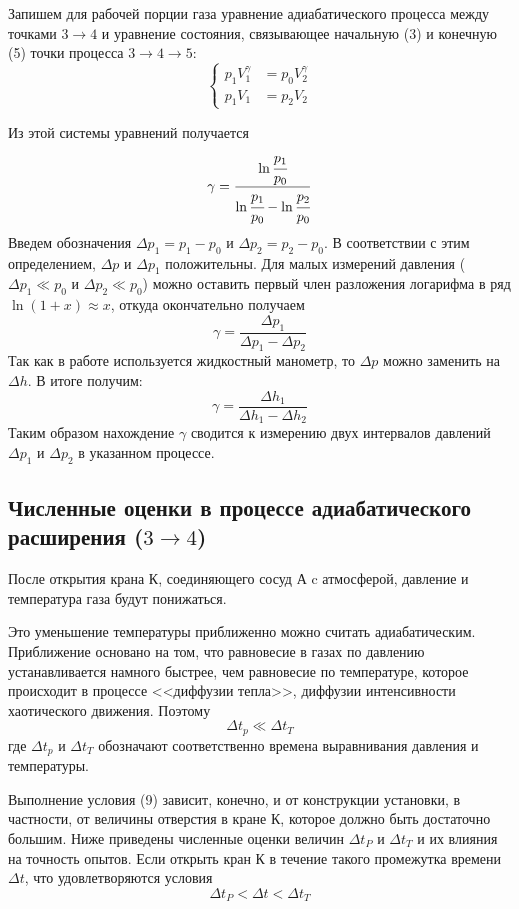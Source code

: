 \documentclass[a4paper,12pt]{article}
\theoremstyle{plain} %
\theoremstyle{definition} %
\theoremstyle{remark} %
\begin{document}
Запишем для рабочей порции газа уравнение адиабатического процесса между точками $3\rightarrow4$ и уравнение состояния, связывающее начальную (3) и конечную (5) точки процесса $3\rightarrow4\rightarrow5$:
\[
\left\{
\begin{aligned}
p_1V_1^\gamma &= p_0V_2^\gamma \\
p_1V_1 &= p_2V_2
\end{aligned}
\right.
\]

Из этой системы уравнений получается
\begin{equation}
\gamma = \frac{\ln\cfrac{p_1}{p_0}}{\ln \cfrac{p_1}{p_0} - \ln\cfrac{p_2}{p_0}}
\end{equation}
Введем обозначения $\Delta p_1 = p_1 - p_0$ и $\Delta p_2 = p_2 - p_0$. В соответствии с этим определением, $\Delta p$ и $\Delta p_1$ положительны. Для малых измерений давления ($\Delta p_1 \ll p_0$ и $\Delta p_2 \ll p_0$) можно оставить первый член разложения логарифма в ряд $\ln(1+x) \approx x$, откуда окончательно получаем
\begin{equation}
\gamma = \frac{\Delta p_1}{\Delta p_1 - \Delta p_2}
\end{equation}
Так как в работе используется жидкостный манометр, то $\Delta p$ можно заменить на $\Delta h$. В итоге получим:
\begin{equation}
\gamma = \frac{\Delta h_1}{\Delta h_1 - \Delta h_2}
\end{equation}
Таким образом нахождение $\gamma$ сводится к измерению двух интервалов давлений $\Delta p_1$ и $\Delta p_2$ в указанном процессе.
\subsection{Численные оценки в процессе адиабатического расширения ($3\rightarrow4$) }
После открытия крана $\text{К}$, соединяющего сосуд $\text{А}$ c атмосферой, давление и температура газа будут понижаться. 

Это уменьшение температуры приближенно можно считать адиабатическим. Приближение основано на том, что равновесие в газах по давлению устанавливается намного быстрее, чем равновесие по температуре, которое происходит в процессе <<диффузии тепла>>, диффузии интенсивности хаотического движения. Поэтому
\begin{equation}
\Delta t_p \ll \Delta t_T
\end{equation}
где $\Delta t_p$ и $\Delta t_T$ обозначают соответственно времена выравнивания давления и температуры.

Выполнение условия (9) зависит, конечно, и от конструкции установки, в частности, от величины отверстия в кране $\text{К}$, которое должно быть достаточно большим. Ниже приведены численные оценки величин $\Delta t_P$ и $\Delta t_T$ и их влияния на точность опытов. Если открыть кран $\text{К}$ в течение такого промежутка времени $\Delta t$, что удовлетворяются условия
\begin{equation}
\Delta t_P < \Delta t < \Delta t_T
\end{equation}
\end{document}
